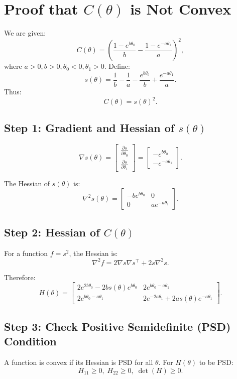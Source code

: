 \documentclass[12pt]{article}
\begin{document}
\section*{Proof that \( C(\theta) \) is Not Convex}

We are given:
\[
C(\theta) = \left( \frac{1 - e^{b\theta_0}}{b} - \frac{1 - e^{-a\theta_1}}{a} \right)^2,
\]
where \( a > 0, b > 0, \theta_0 < 0, \theta_1 > 0 \).
Define:
\[
s(\theta) = \frac{1}{b} - \frac{1}{a} - \frac{e^{b\theta_0}}{b} + \frac{e^{-a\theta_1}}{a}.
\]
Thus:
\[
C(\theta) = s(\theta)^2.
\]

\subsection*{Step 1: Gradient and Hessian of \( s(\theta) \)}
\[
\nabla s(\theta) =
\begin{bmatrix}
\frac{\partial s}{\partial \theta_0} \\[4pt]
\frac{\partial s}{\partial \theta_1}
\end{bmatrix} =
\begin{bmatrix}
- e^{b\theta_0} \\[4pt]
- e^{-a\theta_1}
\end{bmatrix}.
\]

The Hessian of \( s(\theta) \) is:
\[
\nabla^2 s(\theta) =
\begin{bmatrix}
- b e^{b\theta_0} & 0 \\[4pt]
0 & a e^{-a\theta_1}
\end{bmatrix}.
\]

\subsection*{Step 2: Hessian of \( C(\theta) \)}
For a function \( f = s^2 \), the Hessian is:
\[
\nabla^2 f = 2 \nabla s \nabla s^\top + 2 s \nabla^2 s.
\]

Therefore:
\[
H(\theta) =
\begin{bmatrix}
2 e^{2b\theta_0} - 2 b s(\theta) e^{b\theta_0} &
2 e^{b\theta_0 - a\theta_1} \\[6pt]
2 e^{b\theta_0 - a\theta_1} &
2 e^{-2a\theta_1} + 2 a s(\theta) e^{-a\theta_1}
\end{bmatrix}.
\]

\subsection*{Step 3: Check Positive Semidefinite (PSD) Condition}
A function is convex if its Hessian is PSD for all \(\theta\).
For \(H(\theta)\) to be PSD:
\[
H_{11} \ge 0,\; H_{22} \ge 0,\; \det(H) \ge 0.
\]
\end{document}
